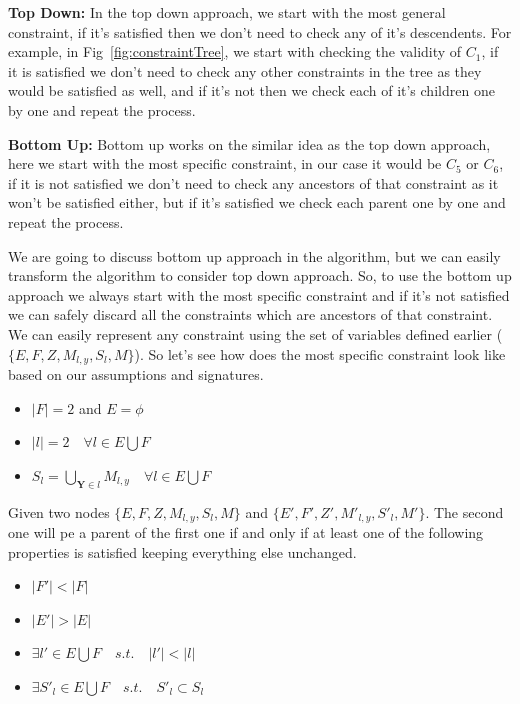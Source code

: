 \documentclass{article}
\newcommand{\TY}{\textbf{Y}\xspace}
\begin{document}
\textbf{Top Down:} In the top down approach, we start with the most general constraint, if it's satisfied then we don't need to check any of it's descendents. For example, in Fig~\ref{fig:constraintTree}, we start with checking the validity of $C_1$, if it is satisfied we don't need to check any other constraints in the tree as they would be satisfied as well, and if it's not then we check each of it's children one by one and repeat the process.

\textbf{Bottom Up:} Bottom up works on the similar idea as the top down approach, here we start with the most specific constraint, in our case it would be $C_5$ or $C_6$, if it is not satisfied we don't need to check any ancestors of that constraint as it won't be satisfied either, but if it's satisfied we check each parent one by one and repeat the process.

We are going to discuss bottom up approach in the algorithm, but we can easily transform the algorithm to consider top down approach. So, to use the bottom up approach we always start with the most specific constraint and if it's not satisfied we can safely discard all the constraints which are ancestors of that constraint. We can easily represent any constraint using the set of variables defined earlier ($\{E, F, Z, M_{l,y}, S_l, M\}$). So let's see how does the most specific constraint look like based on our assumptions and signatures.
\begin{itemize}
\item $|F| = 2$ and $E=\phi$
\item $|l|=2 \quad \forall l \in E \bigcup F$ 
\item $S_{l} = \bigcup_{\TY \in l} M_{l,y} \quad \forall l \in E \bigcup F$
\end{itemize}
Given two nodes $\{E, F, Z, M_{l,y}, S_l, M\}$ and $\{E', F', Z', M'_{l,y}, S'_l, M'\}$. The second one will pe a parent of the first one if and only if at least one of the following properties is satisfied keeping everything else unchanged.
\begin{itemize}
\item $|F'| < |F|$
\item $|E'| > |E|$
\item $\exists l'\in E \bigcup F \quad s.t. \quad  |l'| < |l|$ 
\item $\exists S'_l\in E \bigcup F \quad s.t. \quad S'_l \subset S_l$
\end{itemize}



\end{document}
